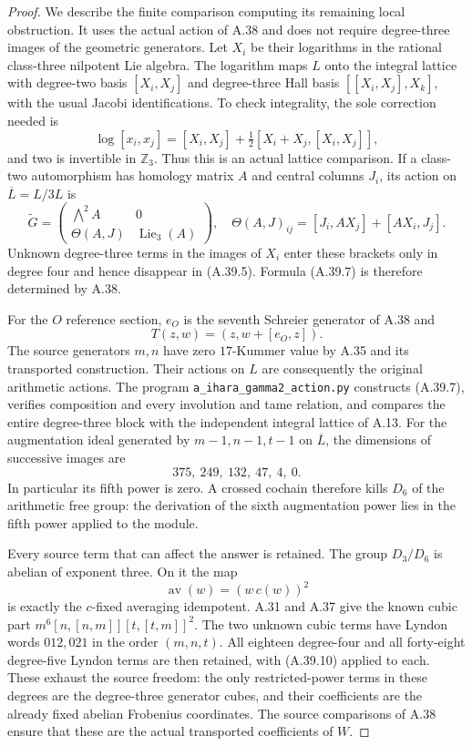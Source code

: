 \begin{proof}
We describe the finite comparison computing its remaining
local obstruction. It uses the actual action of A.38 and
does not require degree-three images of the geometric
generators. Let $X_i$ be their logarithms in the rational
class-three nilpotent Lie algebra. The logarithm maps $L$
onto the integral lattice with degree-two basis $[X_i,X_j]$
and degree-three Hall basis $[[X_i,X_j],X_k]$, with the usual
Jacobi identifications. To check integrality, the sole
correction needed is
\[
 \log[x_i,x_j]=[X_i,X_j]
       +\tfrac12[X_i+X_j,[X_i,X_j]],
 \tag{A.39.6}
\]
and two is invertible in $\mathbb Z_3$. Thus this is an
actual lattice comparison. If a class-two automorphism has
homology matrix $A$ and central columns $J_i$, its action on
$\overline L=L/3L$ is
\[
 \widetilde G=
 \begin{pmatrix}\bigwedge^2A&0\\
       \Theta(A,J)&\operatorname{Lie}_3(A)\end{pmatrix},
 \quad
 \Theta(A,J)_{ij}=[J_i,A X_j]+[A X_i,J_j].
 \tag{A.39.7}
\]
Unknown degree-three terms in the images of $X_i$ enter these
brackets only in degree four and hence disappear in (A.39.5).
Formula (A.39.7) is therefore determined by A.38.

For the $O$ reference section, $e_O$ is the seventh Schreier
generator of A.38 and
\[
                     T(z,w)=(z,w+[e_O,z]).
 \tag{A.39.8}
\]
The source generators $m,n$ have zero $17$-Kummer value by
A.35 and its transported construction. Their actions on $L$
are consequently the original arithmetic actions. The
program \texttt{a\_ihara\_gamma2\_action.py} constructs
(A.39.7), verifies composition and every involution and tame
relation, and compares the entire degree-three block with the
independent integral lattice of A.13. For the augmentation
ideal generated by $m-1,n-1,t-1$ on $\overline L$, the dimensions
of successive images are
\[
                  375,\ 249,\ 132,\ 47,\ 4,\ 0.
 \tag{A.39.9}
\]
In particular its fifth power is zero. A crossed cochain
therefore kills $D_6$ of the arithmetic free group: the
derivation of the sixth augmentation power lies in the fifth
power applied to the module.

Every source term that can affect the answer is retained.
The group $D_3/D_6$ is abelian of exponent three. On it the
map
\[
                  \operatorname{av}(w)=(w\,c(w))^2
 \tag{A.39.10}
\]
is exactly the $c$-fixed averaging idempotent. A.31 and A.37
give the known cubic part
$m^6[n,[n,m]][t,[t,m]]^2$. The two unknown cubic terms have
Lyndon words $012,021$ in the order $(m,n,t)$. All eighteen
degree-four and all forty-eight degree-five Lyndon terms
are then retained, with (A.39.10) applied to each. These
exhaust the source freedom: the only restricted-power terms
in these degrees are the degree-three generator cubes, and
their coefficients are the already fixed abelian Frobenius
coordinates. The source comparisons of A.38 ensure that
these are the actual transported coefficients of $W$.


\end{proof}

